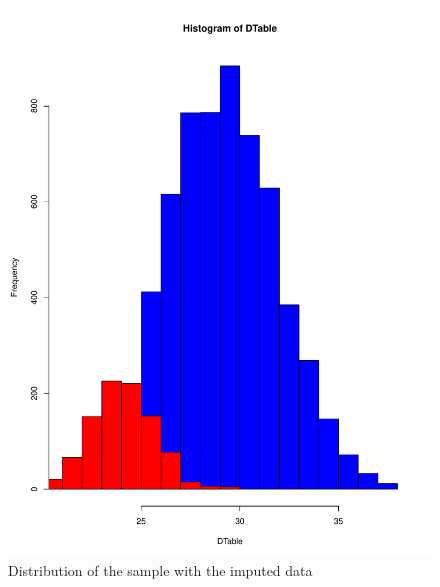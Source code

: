 \documentclass[10pt,a4paper]{article}
\begin{document}
\begin{enumerate}
\begin{figure}
\includegraphics[scale=0.3]{Hist5.pdf}
\caption{Distribution of the sample with the imputed data}
\label{fig-6}
\end{figure}
\begin{figure}

\end{figure}
\end{enumerate}
\end{document}
